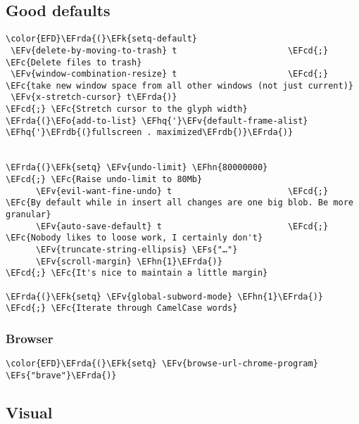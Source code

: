 \documentclass[12pt]{article}
\theoremstyle{plain}%
\theoremstyle{definition}
\theoremstyle{remark}
\newcommand{\EFc}[1]{\textcolor{EFc}{#1}} %
\newcommand{\EFcd}[1]{\textcolor{EFcd}{#1}} %
\newcommand{\EFs}[1]{\textcolor{EFs}{#1}} %
\newcommand{\EFk}[1]{\textcolor{EFk}{#1}} %
\newcommand{\EFv}[1]{\textcolor{EFv}{#1}} %
\newcommand{\EFo}[1]{\textcolor{EFo}{#1}} %
\newcommand{\EFhn}[1]{\textcolor{EFhn}{\textbf{#1}}} %
\newcommand{\EFhq}[1]{\textcolor{EFhq}{#1}} %
\newcommand{\EFrda}[1]{\textcolor{EFrda}{#1}} %
\newcommand{\EFrdb}[1]{\textcolor{EFrdb}{#1}} %
\begin{document}
\subsection{Good defaults}
\label{sec:org35a7dbd}
\begin{Code}
\begin{Verbatim}
\color{EFD}\EFrda{(}\EFk{setq-default}
 \EFv{delete-by-moving-to-trash} t                      \EFcd{;} \EFc{Delete files to trash}
 \EFv{window-combination-resize} t                      \EFcd{;} \EFc{take new window space from all other windows (not just current)}
 \EFv{x-stretch-cursor} t\EFrda{)}                              \EFcd{;} \EFc{Stretch cursor to the glyph width}
\EFrda{(}\EFo{add-to-list} \EFhq{'}\EFv{default-frame-alist} \EFhq{'}\EFrdb{(}fullscreen . maximized\EFrdb{)}\EFrda{)}


\EFrda{(}\EFk{setq} \EFv{undo-limit} \EFhn{80000000}                         \EFcd{;} \EFc{Raise undo-limit to 80Mb}
      \EFv{evil-want-fine-undo} t                       \EFcd{;} \EFc{By default while in insert all changes are one big blob. Be more granular}
      \EFv{auto-save-default} t                         \EFcd{;} \EFc{Nobody likes to loose work, I certainly don't}
      \EFv{truncate-string-ellipsis} \EFs{"…"}
      \EFv{scroll-margin} \EFhn{1}\EFrda{)}                            \EFcd{;} \EFc{It's nice to maintain a little margin}

\EFrda{(}\EFk{setq} \EFv{global-subword-mode} \EFhn{1}\EFrda{)}                           \EFcd{;} \EFc{Iterate through CamelCase words}
\end{Verbatim}
\end{Code}
\subsubsection{Browser}
\label{sec:orgcc8ab18}
\begin{Code}
\begin{Verbatim}
\color{EFD}\EFrda{(}\EFk{setq} \EFv{browse-url-chrome-program} \EFs{"brave"}\EFrda{)}
\end{Verbatim}
\end{Code}
\subsection{Visual}
\label{sec:org515e5a9}
\end{document}
